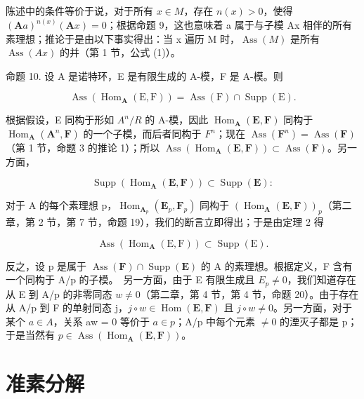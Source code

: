 陈述中的条件等价于说，对于所有 \(x \in M\)，存在 \(n(x) > 0\)，使得 \((\mathbf{A}a)^{n(x)}(\mathbf{A}x) = 0\)；根据命题 9，这也意味着 a 属于与子模 Ax 相伴的所有素理想；推论于是由以下事实得出：当 x 遍历 M 时，\(\operatorname{Ass}(M)\) 是所有 \(\operatorname{Ass}(Ax)\) 的并（第 1 节，公式 (1)）。

命题 10. 设 A 是诺特环，E 是有限生成的 A-模，F 是 A-模。则

\[
\operatorname{Ass} \left(\operatorname{Hom} _ {\mathbf {A}} (\mathrm{E}, \mathrm{F})\right) = \operatorname{Ass} (\mathrm{F}) \cap \operatorname{Supp} (\mathrm{E}).\tag{5}
\]

根据假设，E 同构于形如 \(A^{n}/R\) 的 A-模，因此 \(\operatorname{Hom}_{\mathbf{A}}(\mathbf{E}, \mathbf{F})\) 同构于 \(\operatorname{Hom}_{\mathbf{A}}(\mathbf{A}^{n}, \mathbf{F})\) 的一个子模，而后者同构于 \(F^{n}\)；现在 \(\operatorname{Ass}(\mathbf{F}^{n}) = \operatorname{Ass}(\mathbf{F})\)（第 1 节，命题 3 的推论 1）；所以 \(\operatorname{Ass}(\operatorname{Hom}_{\mathbf{A}}(\mathbf{E}, \mathbf{F})) \subset \operatorname{Ass}(\mathbf{F})\)。另一方面，

\[
\operatorname{Supp} (\operatorname{Hom} _ {\mathbf {A}} (\mathbf {E}, \mathbf {F})) \subset \operatorname{Supp} (\mathbf {E}):
\]

对于 A 的每个素理想 p，\(\operatorname{Hom}_{\mathbf{A}_{p}}(\mathbf{E}_{p}, \mathbf{F}_{p})\) 同构于 \((\operatorname{Hom}_{\mathbf{A}}(\mathbf{E}, \mathbf{F}))_{p}\)（第二章，第 2 节，第 7 节，命题 19），我们的断言立即得出；于是由定理 2 得

\[
\operatorname{Ass} \left(\operatorname{Hom} _ {\mathbf {A}} (\mathrm{E}, \mathrm{F})\right) \subset \operatorname{Supp} (\mathrm{E}).
\]

反之，设 p 是属于 \(\operatorname{Ass}(\mathbf{F}) \cap \operatorname{Supp}(\mathbf{E})\) 的 A 的素理想。根据定义，F 含有一个同构于 A/p 的子模。~另一方面，由于 E 有限生成且 \(E_{p} \neq 0\)，我们知道存在从 E 到 A/p 的非零同态 \(w \neq 0\)（第二章，第 4 节，第 4 节，命题 20）。由于存在从 A/p 到 F 的单射同态 j，\(j \circ w \in \operatorname{Hom}(\mathbf{E}, \mathbf{F})\) 且 \(j \circ w \neq 0\)。另一方面，对于某个 \(a \in A\)，关系 aw = 0 等价于 \(a \in p\)；A/p 中每个元素 \(\neq 0\) 的湮灭子都是 p；于是当然有 \(p \in \operatorname{Ass}(\operatorname{Hom}_{\mathbf{A}}(\mathbf{E}, \mathbf{F}))\)。

\section{准素分解}

